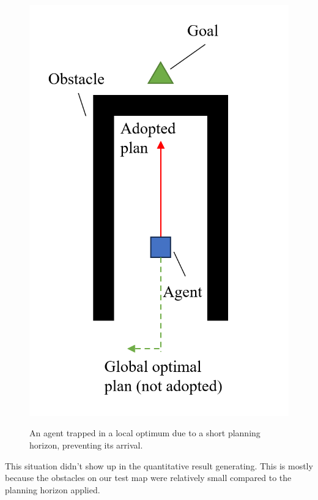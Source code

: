 \begin{figure}[htbp]
    \centering
    \includegraphics[width = 0.34\linewidth]{figures/Local Optimal Trap.png}
    \label{fig:LocalOptimalTrap}
    \caption{An agent trapped in a local optimum due to a short planning horizon, preventing its arrival.}%
\end{figure}
\FloatBarrier

This situation didn't show up in the quantitative result generating. This is mostly because the obstacles on our test map were relatively small compared to the planning horizon applied.



